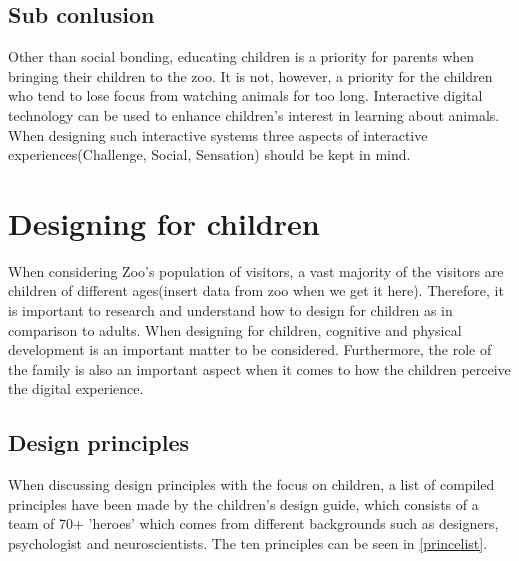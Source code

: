 \subsection{Sub conlusion}
Other than social bonding, educating children is a priority for parents when bringing their children to the zoo. It is not, however, a priority for the children who tend to lose focus from watching animals for too long\cite{togetherAtTheZoo}. Interactive digital technology can be used to enhance children's interest in learning about animals\cite{webberInteractiveTechInZoo}. When designing such interactive systems three aspects of interactive experiences(Challenge, Social, Sensation) should be kept in mind\cite{Hull2018}.

\section{Designing for children}
When considering Zoo's population of visitors, a vast majority of the visitors are children of different ages(insert data from zoo when we get it here). Therefore, it is important to research and understand how to design for children as in comparison to adults. 
When designing for children, cognitive and physical development is an important matter to be considered\cite{kidsDesign}. Furthermore, the role of the family is also an important aspect when it comes to how the children perceive the digital experience\cite{kidsDesign}.

\subsection{Design principles}
When discussing design principles with the focus on children, a list of compiled principles have been made by the children's design guide\cite{kidsDesign}, which consists of a team of 70+ 'heroes' which comes from different backgrounds such as designers, psychologist and neuroscientists. The ten principles can be seen in \autoref{princelist}.

